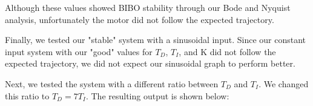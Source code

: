 
Although these values showed BIBO stability through our Bode and Nyquist analysis, unfortunately the motor did not follow the expected trajectory. 

Finally, we tested our "stable" system with a sinusoidal input. Since our constant input system with our "good" values for $T_D$, $T_I$, and K did not follow the expected trajectory, we did not expect our sinusoidal graph to perform better. 



Next, we tested the system with a different ratio between $T_D$ and $T_I$. We changed this ratio to $T_D = 7T_I$. The resulting output is shown below:


